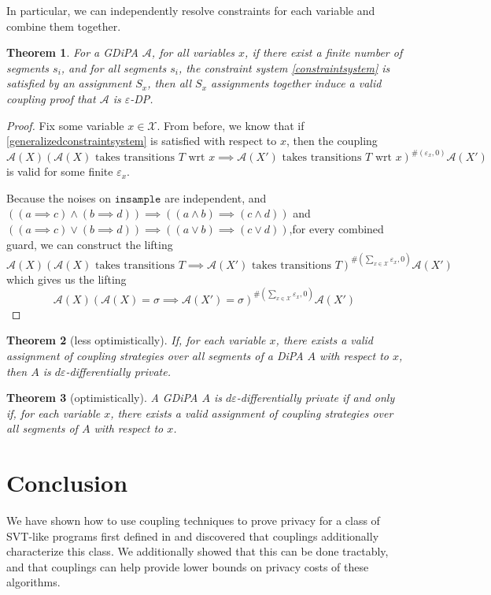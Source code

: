 \documentclass[12pt]{article}
\newtheorem{thm}{Theorem}[section]
\theoremstyle{definition}
\begin{document}
In particular, we can independently resolve constraints for each variable and combine them together.
\begin{thm}	
	For a GDiPA $\mathcal{A}$, for all variables $x$, if there exist a finite number of segments $s_i$, and for all segments $s_i$, the constraint system \ref{constraintsystem} is satisfied by an assignment $S_x$, then all $S_x$ assignments together induce a valid coupling proof that $\mathcal{A}$ is $\varepsilon$-DP. 
\end{thm}

\begin{proof}
	
	Fix some variable $x\in \mathcal{X}$. From before, we know that if \ref{generalizedconstraintsystem} is satisfied with respect to $x$, then the coupling 
	\[\mathcal{A}(X)(\mathcal{A}(X)\text{ takes transitions }T\text{ wrt }x\implies \mathcal{A}(X')\text{ takes transitions }T\text{ wrt }x)^{\#(\varepsilon_x, 0)}\mathcal{A}(X')\]
	is valid for some finite $\varepsilon_x$. 
		
	Because the noises on $\texttt{insample}$ are independent, and $((a \implies c) \land (b \implies d)) \implies ((a \land b) \implies (c \land d))$ and $((a \implies c) \lor (b \implies d)) \implies ((a \lor b) \implies (c \lor d))$,for every combined guard, we can construct the lifting 
	\[\mathcal{A}(X)(\mathcal{A}(X)\text{ takes transitions }T\implies \mathcal{A}(X')\text{ takes transitions }T)^{\#(\sum_{x\in\mathcal{X}}\varepsilon_x, 0)}\mathcal{A}(X')\]
	which gives us the lifting
	\[\mathcal{A}(X)(\mathcal{A}(X)=\sigma\implies \mathcal{A}(X')=\sigma)^{\#(\sum_{x\in\mathcal{X}}\varepsilon_x, 0)}\mathcal{A}(X')\]
\end{proof}

\begin{thm}[less optimistically]
    If, for each variable $x$, there exists a valid assignment of coupling strategies over all segments of a DiPA $A$ with respect to $x$, then $A$ is $d\varepsilon$-differentially private. 
\end{thm}

\begin{thm}[optimistically]
    A GDiPA $A$ is $d\varepsilon$-differentially private if and only if, for each variable $x$, there exists a valid assignment of coupling strategies over all segments of $A$ with respect to $x$. 
\end{thm}

\section{Conclusion}
We have shown how to use coupling techniques to prove privacy for a class of SVT-like programs first defined in \cite{chadhaLinearTimeDecidability2021} and discovered that couplings additionally characterize this class. We additionally showed that this can be done tractably, and that couplings can help provide lower bounds on privacy costs of these algorithms. 
\end{document}
